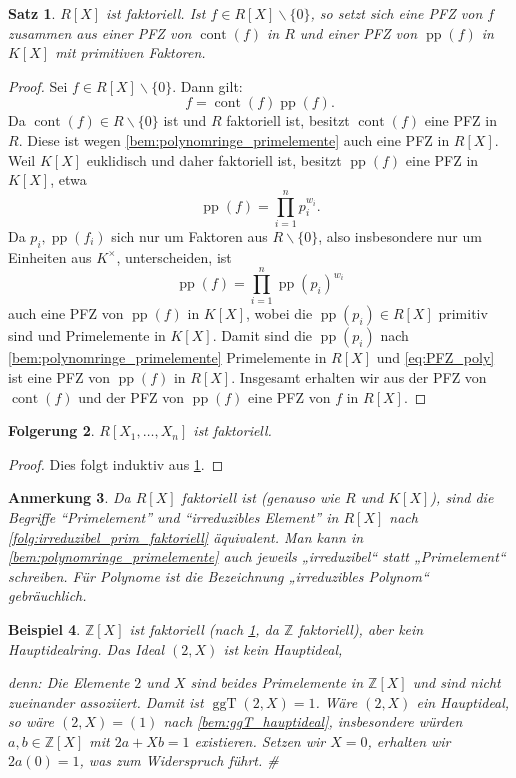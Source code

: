 \documentclass[a4paper, twoside, 11pt, ngerman]{report}
\newcommand{\ZZ}{\mathds Z}
\renewcommand{\setminus}{\smallsetminus}
\DeclareMathOperator{\cont}{cont}
\DeclareMathOperator{\ggT}{ggT}
\DeclareMathOperator{\pp}{pp}
\theoremstyle{definistyle}
\newtheorem{satz}{Satz}[section]
\newtheorem{anm}[satz]{Anmerkung}
\newtheorem{folgerung}[satz]{Folgerung}
\newtheorem{bsp}[satz]{Beispiel}
\theoremstyle{remark}
\newenvironment{denn}%
  {\par\textit{denn:}}%
  {\hfill\#\par}
\begin{document}
\begin{satz}\label{satz:polynomring_faktoriell}
$R[X]$ ist faktoriell. Ist $f \in R[X] \setminus \{0\}$, so setzt sich eine PFZ von $f$ zusammen aus einer PFZ von $\cont(f)$ in $R$ und einer PFZ von $\pp(f)$ in $K[X]$ mit primitiven Faktoren.
\end{satz}

\begin{proof}
Sei $f \in R[X] \setminus \{0\}$. Dann gilt:
\[
f = \cont(f) \pp(f).
\]
Da $\cont(f) \in R \setminus \{0\}$ ist und $R$ faktoriell ist, besitzt $\cont(f)$ eine PFZ in $R$. Diese ist wegen \ref{bem:polynomringe_primelemente} auch eine PFZ in $R[X]$.
Weil $K[X]$ euklidisch und daher faktoriell ist, besitzt $\pp(f)$ eine PFZ in $K[X]$, etwa
\[
\pp(f) = \prod_{i=1}^n p_i^{w_i}.
\]
Da $p_i, \pp(f_i)$ sich nur um Faktoren aus $R \setminus \{0\}$, also insbesondere nur um Einheiten aus $K^\times$, unterscheiden, ist
\[
\pp(f) = \prod_{i=1}^n \pp(p_i)^{w_i} \tag{*} \label{eq:PFZ_poly}
\]
auch eine PFZ von $\pp(f)$ in $K[X]$, wobei die $\pp(p_i)\in R[X]$ primitiv sind und Primelemente in $K[X]$. Damit sind die $\pp(p_i)$ nach \ref{bem:polynomringe_primelemente} Primelemente in $R[X]$ und \eqref{eq:PFZ_poly} ist eine PFZ von $\pp(f)$ in $R[X]$.
Insgesamt erhalten wir aus der PFZ von $\cont(f)$ und der PFZ von $\pp(f)$ eine PFZ von $f$
in $R[X]$.
\end{proof}

\begin{folgerung}\label{folgerung:polynomringe_mehrere_variablen}
$R[X_1, \dots, X_n]$ ist faktoriell.
\end{folgerung}

\begin{proof}
Dies folgt induktiv aus \ref{satz:polynomring_faktoriell}.
\end{proof}

\begin{anm}\label{anm:polynomringe_irreduzibel_vs_prim}
Da $R[X]$ faktoriell ist (genauso wie $R$ und $K[X]$), sind die Begriffe "`Primelement"' und "`irreduzibles Element"' in $R[X]$ nach \ref{folg:irreduzibel_prim_faktoriell} äquivalent. Man kann in \ref{bem:polynomringe_primelemente} auch jeweils „irreduzibel“ statt „Primelement“ schreiben. Für Polynome ist die Bezeichnung „irreduzibles Polynom“ gebräuchlich.
\end{anm}

\begin{bsp}\label{bsp:polynomring_kein_hjr}
$\ZZ[X]$ ist faktoriell (nach \ref{satz:polynomring_faktoriell}, da $\ZZ$ faktoriell), aber kein Hauptidealring. Das Ideal $(2, X)$ ist kein Hauptideal,
\begin{denn}
Die Elemente $2$ und $X$ sind beides Primelemente in $\ZZ[X]$ und sind nicht zueinander assoziiert. Damit ist $\ggT(2,X)=1$. Wäre $(2,X)$ ein Hauptideal, so wäre $(2,X)=(1)$ nach \ref{bem:ggT_hauptideal}, insbesondere würden $a,b\in\ZZ[X]$ mit $2a+Xb=1$ existieren. Setzen wir $X=0$, erhalten wir $2a(0)=1$, was zum Widerspruch führt.
\end{denn}
\end{bsp}
\end{document}
